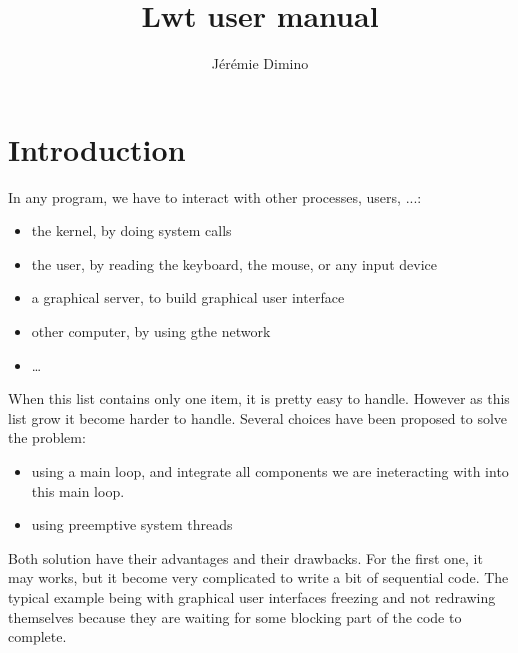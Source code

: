\documentclass{article}
\title{Lwt user manual}
\author{Jérémie Dimino}
\begin{document}
\maketitle


\setcounter{tocdepth}{2}
\tableofcontents

\section{Introduction}

In any program, we have to interact with other processes, users, ...:

\begin{itemize}
\item the kernel, by doing system calls
\item the user, by reading the keyboard, the mouse, or any input
  device
\item a graphical server, to build graphical user interface
\item other computer, by using gthe network
\item \dots
\end{itemize}

When this list contains only one item, it is pretty easy to
handle. However as this list grow it become harder to handle. Several
choices have been proposed to solve the problem:

\begin{itemize}
\item using a main loop, and integrate all components we are
  ineteracting with into this main loop.
\item using preemptive system threads
\end{itemize}

Both solution have their advantages and their drawbacks. For the first
one, it may works, but it become very complicated to write a bit of
sequential code. The typical example being with graphical user
interfaces freezing and not redrawing themselves because they are
waiting for some blocking part of the code to complete.
\end{document}
